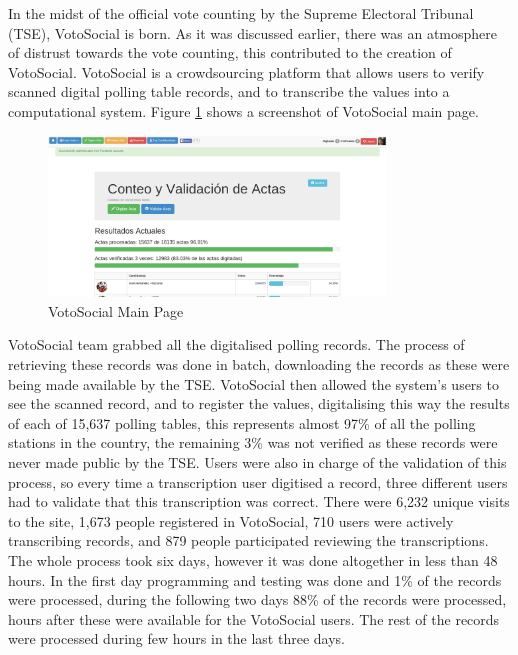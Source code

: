 \documentclass[letterpaper,10pt]{article}
\begin{document}
In the midst of the official vote counting by the Supreme Electoral Tribunal (TSE), VotoSocial is born. As it was discussed earlier, there was an atmosphere of distrust towards the vote counting, this contributed to the creation of VotoSocial. VotoSocial is a crowdsourcing platform that allows users to verify scanned digital polling table records, and to transcribe the values into a computational system. Figure \ref{fig:main} shows a screenshot of VotoSocial main page.

\begin{figure}[h!]
    \centering
    \includegraphics[width=0.8\textwidth]{images/vs-main}
    \caption{VotoSocial Main Page}
    \label{fig:main}
\end{figure}


VotoSocial team grabbed all the digitalised polling records. The process of retrieving these records was done in batch, downloading the records as these were being made available by the TSE. VotoSocial then allowed the system's users to see the scanned record, and to register the values, digitalising this way the results of each of 15,637 polling tables, this represents almost 97\% of all the polling stations in the country, the remaining 3\% was not verified as these records were never made public by the TSE. Users were also in charge of the validation of this process, so every time a transcription user digitised a record, three different users had to validate that this transcription was correct. There were 6,232 unique visits to the site, 1,673 people registered in VotoSocial, 710 users were actively transcribing records, and 879 people participated reviewing the transcriptions. The whole process took six days, however it was done altogether in less than 48 hours. In the first day programming and testing was done and 1\% of the records were processed, during the following two days 88\% of the records were processed, hours after these were available for the VotoSocial users. The rest of the records were processed during few hours in the last three days.
\end{document}
